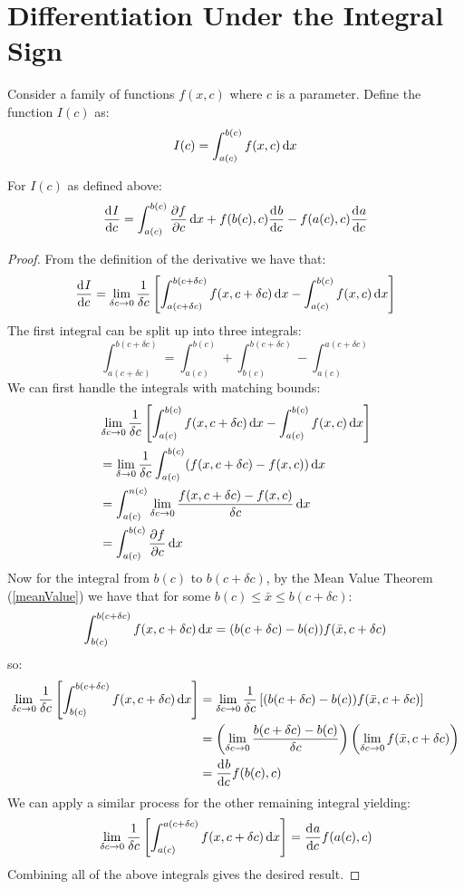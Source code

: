 \documentclass[../main.tex]{subfiles}
\begin{document}
\section{Differentiation Under the Integral Sign}
Consider a family of functions $f(x, c)$ where $c$ is a parameter.
Define the function $I(c)$ as:
\[
  I(c) = \int_{a(c)}^{b(c)} f(x, c) \d{x}
\]
\begin{theorem}
  For $I(c)$ as defined above:
  \[
    \deriv{I}{c} = \int_{a(c)}^{b(c)} \pderiv{f}{c} \d{x} + f(b(c), c) \deriv{b}{c} - f(a(c), c) \deriv{a}{c}
    \label{dutis}
  \]
\end{theorem}
\begin{proof}
  From the definition of the derivative we have that:
  \[
    \deriv{I}{c} = \lim_{\delta c \to 0} \frac{1}{\delta c} \left[\int_{a(c + \delta c)}^{b(c + \delta c)} f(x, c + \delta c) \d{x} - \int_{a(c)}^{b(c)} f(x, c) \d{x}\right]
  \]
  The first integral can be split up into three integrals:
  \[
    \int_{a(c + \delta c)}^{b(c + \delta c)} = \int_{a(c)}^{b(c)} + \int_{b(c)}^{b(c + \delta c)} - \int_{a(c)}^{a(c + \delta c)}
  \]
We can first handle the integrals with matching bounds:
\begin{align*}
  &\lim_{\delta c \to 0} \frac{1}{\delta c} \left[\int_{a(c)}^{b(c)} f(x, c + \delta c) \d{x} - \int_{a(c)}^{b(c)} f(x, c) \d{x}\right] \\
  &= \lim_{\delta \to 0} \frac{1}{\delta c} \int_{a(c)}^{b(c)} (f(x, c + \delta c) - f(x, c)) \d{x} \\
  &= \int_{a(c)}^{n(c)} \lim_{\delta c \to 0} \frac{f(x, c + \delta c) - f(x, c)}{\delta c} \d{x} \\
  &= \int_{a(c)}^{b(c)} \pderiv{f}{c} \d{x}
\end{align*}
Now for the integral from $b(c)$ to $b(c + \delta c)$, by the Mean Value Theorem (\cref{meanValue}) we have that for some $b(c) \leq \bar{x} \leq b(c + \delta c)$:
\[
  \int_{b(c)}^{b(c + \delta c)} f(x, c + \delta c) \d{x} = (b(c + \delta c) - b(c))f(\bar{x}, c + \delta c)
\]
so:
\begin{align*}
  \lim_{\delta c \to 0} \frac{1}{\delta c} \left[\int_{b(c)}^{b(c + \delta c)} f(x, c + \delta c) \d{x}\right] &= \lim_{\delta c \to 0} \frac{1}{\delta c} \left[(b(c + \delta c) - b(c))f(\bar{x}, c + \delta c)\right] \\
  &= \left(\lim_{\delta c \to 0} \frac{b(c + \delta c) - b(c)}{\delta c} \right)\left(\lim_{\delta c \to 0} f(\bar{x}, c + \delta c)\right) \\
  &= \deriv{b}{c} f(b(c), c)
\end{align*}
We can apply a similar process for the other remaining integral yielding:
\[
  \lim_{\delta c \to 0} \frac{1}{\delta c} \left[\int_{a(c)}^{a(c + \delta c)} f(x, c + \delta c) \d{x}\right] = \deriv{a}{c} f(a(c), c)
\]
Combining all of the above integrals gives the desired result.
\end{proof}
\end{document}
